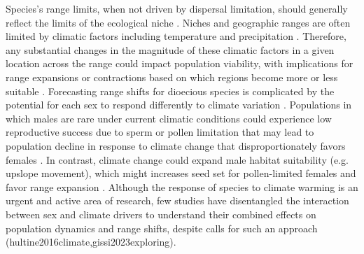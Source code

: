 \documentclass[12pt]{article}
\begin{document}
Species's range limits, when not driven by dispersal limitation, should generally reflect the limits of the ecological niche \citep{lee2016synthesis}.
Niches and geographic ranges are often limited by climatic factors including temperature and precipitation \citep{sexton2009evolution}. 
Therefore, any substantial changes in the magnitude of these climatic factors in a given location across the range could impact population viability, with implications for range expansions or contractions based on which regions become more or less suitable  \citep{davis2001range, pease1989model}. 
Forecasting range shifts for dioecious species is complicated by the potential for each sex to respond differently to climate variation \citep{pottier2021sexual,hultine2016climate,morrison2016causes}.
Populations in which males are rare under current climatic conditions could experience low reproductive success due to sperm or pollen limitation that may lead to population decline in response to climate change that disproportionately favors females \citep{eberhart2017sex}.
In contrast, climate change could expand male habitat suitability (e.g. upslope movement), which might increases seed set for pollen-limited females and favor range expansion \citep{petry2016sex}.
Although the response of species to climate warming is an urgent and active area of research, few studies have disentangled the interaction between sex and climate drivers to understand their combined effects on population dynamics and range shifts, despite calls for such an approach (hultine2016climate,gissi2023exploring).  
\end{document}
